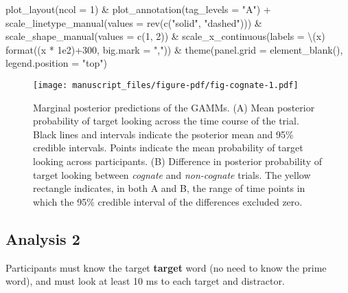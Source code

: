 \documentclass[
  letterpaper,
  DIV=11,
  numbers=noendperiod]{scrartcl}
\newenvironment{Shaded}{\begin{snugshade}}{\end{snugshade}}
\newcommand{\AttributeTok}[1]{\textcolor[rgb]{0.40,0.45,0.13}{#1}}
\newcommand{\DecValTok}[1]{\textcolor[rgb]{0.68,0.00,0.00}{#1}}
\newcommand{\FloatTok}[1]{\textcolor[rgb]{0.68,0.00,0.00}{#1}}
\newcommand{\FunctionTok}[1]{\textcolor[rgb]{0.28,0.35,0.67}{#1}}
\newcommand{\NormalTok}[1]{\textcolor[rgb]{0.00,0.23,0.31}{#1}}
\newcommand{\SpecialCharTok}[1]{\textcolor[rgb]{0.37,0.37,0.37}{#1}}
\newcommand{\StringTok}[1]{\textcolor[rgb]{0.13,0.47,0.30}{#1}}
\begin{document}
\begin{Shaded}
\begin{Highlighting}[]
    \FunctionTok{plot\_layout}\NormalTok{(}\AttributeTok{ncol =} \DecValTok{1}\NormalTok{) }\SpecialCharTok{\&}
    \FunctionTok{plot\_annotation}\NormalTok{(}\AttributeTok{tag\_levels =} \StringTok{"A"}\NormalTok{) }\SpecialCharTok{+}
    \FunctionTok{scale\_linetype\_manual}\NormalTok{(}\AttributeTok{values =} \FunctionTok{rev}\NormalTok{(}\FunctionTok{c}\NormalTok{(}\StringTok{"solid"}\NormalTok{, }\StringTok{"dashed"}\NormalTok{))) }\SpecialCharTok{\&}
    \FunctionTok{scale\_shape\_manual}\NormalTok{(}\AttributeTok{values =} \FunctionTok{c}\NormalTok{(}\DecValTok{1}\NormalTok{, }\DecValTok{2}\NormalTok{)) }\SpecialCharTok{\&}
    \FunctionTok{scale\_x\_continuous}\NormalTok{(}\AttributeTok{labels =}\NormalTok{ \textbackslash{}(x) }\FunctionTok{format}\NormalTok{((x }\SpecialCharTok{*} \FloatTok{1e2}\NormalTok{)}\SpecialCharTok{+}\DecValTok{300}\NormalTok{, }
                                            \AttributeTok{big.mark =} \StringTok{","}\NormalTok{)) }\SpecialCharTok{\&}
    \FunctionTok{theme}\NormalTok{(}\AttributeTok{panel.grid =} \FunctionTok{element\_blank}\NormalTok{(),}
          \AttributeTok{legend.position =} \StringTok{"top"}\NormalTok{) }
\end{Highlighting}
\end{Shaded}

\begin{figure}[H]

{\centering \texttt{[image: manuscript\_files/figure-pdf/fig-cognate-1.pdf]}

}

\caption{\label{fig-cognate}Marginal posterior predictions of the GAMMs.
(A) Mean posterior probability of target looking across the time course
of the trial. Black lines and intervals indicate the psoterior mean and
95\% credible intervals. Points indicate the mean probability of target
looking across participants. (B) Difference in posterior probability of
target looking between \emph{cognate} and \emph{non-cognate} trials. The
yellow rectangle indicates, in both A and B, the range of time points in
which the 95\% credible interval of the differences excluded zero.}

\end{figure}

\hypertarget{analysis-2}{%
\subsection{Analysis 2}\label{analysis-2}}

Participants must know the target \textbf{target} word (no need to know
the prime word), and must look at least 10 ms to each target and
distractor.
\end{document}
